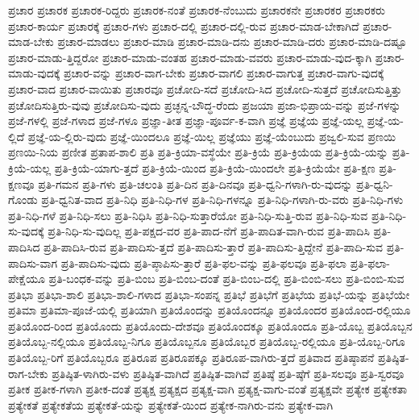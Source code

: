 {ಪ್ರಚಾರ
ಪ್ರಚಾರಕ
ಪ್ರಚಾರಕ-ರಿದ್ದರು
ಪ್ರಚಾರಕ-ನಂತೆ
ಪ್ರಚಾರಕ-ನೆಂಬುದು
ಪ್ರಚಾರಕನೇ
ಪ್ರಚಾರಕರ
ಪ್ರಚಾರಕರು
ಪ್ರಚಾರ-ಕಾರ್ಯ
ಪ್ರಚಾರಕ್ಕೆ
ಪ್ರಚಾರ-ಗಳು
ಪ್ರಚಾರ-ದಲ್ಲಿ
ಪ್ರಚಾರ-ದಲ್ಲಿ-ರುವ
ಪ್ರಚಾರ-ಮಾಡ-ಬೇಕಾಗಿದೆ
ಪ್ರಚಾರ-ಮಾಡ-ಬೇಕು
ಪ್ರಚಾರ-ಮಾಡಲು
ಪ್ರಚಾರ-ಮಾಡಿ
ಪ್ರಚಾರ-ಮಾಡಿ-ದನು
ಪ್ರಚಾರ-ಮಾಡಿ-ದರು
ಪ್ರಚಾರ-ಮಾಡಿ-ದಷ್ಟೂ
ಪ್ರಚಾರ-ಮಾಡು-ತ್ತಿದ್ದರೋ
ಪ್ರಚಾರ-ಮಾಡು-ವಂತಹ
ಪ್ರಚಾರ-ಮಾಡು-ವವರು
ಪ್ರಚಾರ-ಮಾಡು-ವುದ-ಕ್ಕಾಗಿ
ಪ್ರಚಾರ-ಮಾಡು-ವುದಕ್ಕೆ
ಪ್ರಚಾರ-ವನ್ನು
ಪ್ರಚಾರ-ವಾಗ-ಬೇಕು
ಪ್ರಚಾರ-ವಾಗಲಿ
ಪ್ರಚಾರ-ವಾಗುತ್ತ
ಪ್ರಚಾರ-ವಾಗು-ವುದಕ್ಕೆ
ಪ್ರಚಾರ-ವಾದ
ಪ್ರಚಾರ-ವಾಯಿತು
ಪ್ರಚಾರವೂ
ಪ್ರಚೋದಿ-ಸದೆ
ಪ್ರಚೋದಿ-ಸಿದ
ಪ್ರಚೋದಿ-ಸುತ್ತದೆ
ಪ್ರಚೋದಿಸುತ್ತಿತ್ತು
ಪ್ರಚೋದಿಸುತ್ತಿರು-ವುವು
ಪ್ರಚೋದಿಸು-ವುದು
ಪ್ರಚ್ಛನ್ನ-ಬೌದ್ಧ-ರೆಂದು
ಪ್ರಜಯಾ
ಪ್ರಜಾ-ಭಿಪ್ರಾಯ-ವನ್ನು
ಪ್ರಜೆ-ಗಳನ್ನು
ಪ್ರಜೆ-ಗಳಲ್ಲಿ
ಪ್ರಜೆ-ಗಳಾದ
ಪ್ರಜೆ-ಗಳೂ
ಪ್ರಜ್ಞಾ-ತೀತ
ಪ್ರಜ್ಞಾ-ಪೂರ್ವ-ಕ-ವಾಗಿ
ಪ್ರಜ್ಞೆ
ಪ್ರಜ್ಞೆಯ
ಪ್ರಜ್ಞೆ-ಯಲ್ಲ
ಪ್ರಜ್ಞೆ-ಯ-ಲ್ಲಿದೆ
ಪ್ರಜ್ಞೆ-ಯ-ಲ್ಲಿರು-ವುದು
ಪ್ರಜ್ಞೆ-ಯಿಂದಲೂ
ಪ್ರಜ್ಞೆ-ಯಿಲ್ಲ
ಪ್ರಜ್ಞೆಯು
ಪ್ರಜ್ಞೆ-ಯೆಂಬುದು
ಪ್ರಜ್ವಲಿ-ಸುವ
ಪ್ರಣಯಿ
ಪ್ರಣಯಿ-ನಿಯ
ಪ್ರಣೀತ
ಪ್ರತಾಪ-ಶಾಲಿ
ಪ್ರತಿ
ಪ್ರತಿ-ಕ್ರಿಯಾ-ವಸ್ಥೆಯೇ
ಪ್ರತಿ-ಕ್ರಿಯೆ
ಪ್ರತಿ-ಕ್ರಿಯೆಯ
ಪ್ರತಿ-ಕ್ರಿಯೆ-ಯನ್ನು
ಪ್ರತಿ-ಕ್ರಿಯೆ-ಯಲ್ಲ
ಪ್ರತಿ-ಕ್ರಿಯೆ-ಯಾಗು-ತ್ತದೆ
ಪ್ರತಿ-ಕ್ರಿಯೆ-ಯಿಂದ
ಪ್ರತಿ-ಕ್ರಿಯೆ-ಯಿಂದಲೇ
ಪ್ರತಿ-ಕ್ರಿಯೆಯೇ
ಪ್ರತಿ-ಕ್ಷಣ
ಪ್ರತಿ-ಕ್ಷಣವೂ
ಪ್ರತಿ-ಗಮನ
ಪ್ರತಿ-ಗಳು
ಪ್ರತಿ-ಚಲಂತಿ
ಪ್ರತಿ-ದಿನ
ಪ್ರತಿ-ದಿನವೂ
ಪ್ರತಿ-ಧ್ವನಿ-ಗಳಾಗಿ-ರು-ವುದನ್ನು
ಪ್ರತಿ-ಧ್ವನಿ-ಗೊಂಡು
ಪ್ರತಿ-ಧ್ವನಿತ-ವಾದ
ಪ್ರತಿ-ನಿಧಿ
ಪ್ರತಿ-ನಿಧಿ-ಗಳ
ಪ್ರತಿ-ನಿಧಿ-ಗಳನ್ನೂ
ಪ್ರತಿ-ನಿಧಿ-ಗಳಾಗಿ-ರು-ವರು
ಪ್ರತಿ-ನಿಧಿ-ಗಳು
ಪ್ರತಿ-ನಿಧಿ-ಗಳೆ
ಪ್ರತಿ-ನಿಧಿ-ಸಲು
ಪ್ರತಿ-ನಿಧಿಸಿ
ಪ್ರತಿ-ನಿಧಿ-ಸುತ್ತಾರೆಯೋ
ಪ್ರತಿ-ನಿಧಿ-ಸುತ್ತಿ-ರುವ
ಪ್ರತಿ-ನಿಧಿ-ಸುವ
ಪ್ರತಿ-ನಿಧಿ-ಸು-ವುದಕ್ಕೆ
ಪ್ರತಿ-ನಿಧಿ-ಸು-ವುದಿಲ್ಲ
ಪ್ರತಿ-ಪಕ್ಷದ-ವರ
ಪ್ರತಿ-ಪಾದ-ನೆಗೆ
ಪ್ರತಿ-ಪಾದಿತ-ವಾಗಿ-ರುವ
ಪ್ರತಿ-ಪಾದಿಸಿ
ಪ್ರತಿ-ಪಾದಿಸಿದ
ಪ್ರತಿ-ಪಾದಿಸಿ-ರುವ
ಪ್ರತಿ-ಪಾದಿಸು-ತ್ತದೆ
ಪ್ರತಿ-ಪಾದಿಸು-ತ್ತಾರೆ
ಪ್ರತಿ-ಪಾದಿಸು-ತ್ತಿದ್ದೇನೆ
ಪ್ರತಿ-ಪಾದಿ-ಸುವ
ಪ್ರತಿ-ಪಾದಿಸು-ವಾಗ
ಪ್ರತಿ-ಪಾದಿಸು-ವುದು
ಪ್ರತಿ-ಪ್ಠಾಪಿಸು-ತ್ತಾರೆ
ಪ್ರತಿ-ಫಲ-ವನ್ನು
ಪ್ರತಿ-ಫಲವೂ
ಪ್ರತಿ-ಫಲಾ
ಪ್ರತಿ-ಫಲಾ-ಪೇಕ್ಷೆಯೂ
ಪ್ರತಿ-ಬಂಧಕ-ವನ್ನು
ಪ್ರತಿ-ಬಿಂಬ
ಪ್ರತಿ-ಬಿಂಬ-ದಂತೆ
ಪ್ರತಿ-ಬಿಂಬ-ದಲ್ಲಿ
ಪ್ರತಿ-ಬಿಂಬಿ-ಸಲು
ಪ್ರತಿ-ಬಿಂಬಿ-ಸುವ
ಪ್ರತಿಭಾ
ಪ್ರತಿಭಾ-ಶಾಲಿ
ಪ್ರತಿಭಾ-ಶಾಲಿ-ಗಳಾದ
ಪ್ರತಿಭಾ-ಸಂಪನ್ನ
ಪ್ರತಿಭೆ
ಪ್ರತಿಭೆಗೆ
ಪ್ರತಿಭೆಯ
ಪ್ರತಿಭೆ-ಯನ್ನು
ಪ್ರತಿಭೆಯೇ
ಪ್ರತಿಮಾ
ಪ್ರತಿಮಾ-ಪೂಜೆ-ಯಲ್ಲಿ
ಪ್ರತಿಯಾಗಿ
ಪ್ರತಿಯೊಂದನ್ನು
ಪ್ರತಿಯೊಂದನ್ನೂ
ಪ್ರತಿಯೊಂದರ
ಪ್ರತಿಯೊಂದ-ರಲ್ಲಿಯೂ
ಪ್ರತಿಯೊಂದ-ರಿಂದ
ಪ್ರತಿಯೊಂದು
ಪ್ರತಿಯೊಂದು-ದೇಶವೂ
ಪ್ರತಿಯೊಂದಕ್ಕೂ
ಪ್ರತಿಯೊಂದೂ
ಪ್ರತಿ-ಯೊಬ್ಬ
ಪ್ರತಿಯೊಬ್ಬನ
ಪ್ರತಿಯೊಬ್ಬ-ನಲ್ಲಿಯೂ
ಪ್ರತಿಯೊಬ್ಬ-ನಿಗೂ
ಪ್ರತಿಯೊಬ್ಬನೂ
ಪ್ರತಿಯೊಬ್ಬರ
ಪ್ರತಿಯೊಬ್ಬ-ರಲ್ಲಿಯೂ
ಪ್ರತಿ-ಯೊಬ್ಬ-ರಿಗೂ
ಪ್ರತಿಯೊಬ್ಬ-ರಿಗೆ
ಪ್ರತಿಯೊಬ್ಬರೂ
ಪ್ರತಿರೂಪ
ಪ್ರತಿರೂಪಕ್ಕೂ
ಪ್ರತಿರೂಪ-ವಾಗಿರು-ತ್ತದೆ
ಪ್ರತಿವಾದ
ಪ್ರತಿಷ್ಠಾಪನೆ
ಪ್ರತಿಷ್ಠಿತ-ರಾಗ-ಬೇಕು
ಪ್ರತಿಷ್ಠಿತ-ಳಾಗಿರು-ವಳು
ಪ್ರತಿಷ್ಠಿತ-ವಾಗಿದೆ
ಪ್ರತಿಷ್ಠಿತ-ವಾಗಿವೆ
ಪ್ರತಿಷ್ಠೆ
ಪ್ರತಿ-ಷ್ಠೆಗೆ
ಪ್ರತಿ-ಸಲವೂ
ಪ್ರತಿ-ಸ್ವರವೂ
ಪ್ರತೀಕ
ಪ್ರತೀಕ-ಗಳಾಗಿ
ಪ್ರತೀಕ-ದಂತೆ
ಪ್ರತ್ಯಕ್ಷ
ಪ್ರತ್ಯಕ್ಷದ
ಪ್ರತ್ಯಕ್ಷ-ವಾಗಿ
ಪ್ರತ್ಯಕ್ಷ-ವಾಗು-ವಂತೆ
ಪ್ರತ್ಯಕ್ಷವೇ
ಪ್ರತ್ಯೇಕ
ಪ್ರತ್ಯೇಕತಾ
ಪ್ರತ್ಯೇಕತೆ
ಪ್ರತ್ಯೇಕತೆಯ
ಪ್ರತ್ಯೇಕತೆ-ಯನ್ನು
ಪ್ರತ್ಯೇಕತೆ-ಯಿಂದ
ಪ್ರತ್ಯೇಕ-ನಾಗಿರು-ವನು
ಪ್ರತ್ಯೇಕ-ವಾಗಿ
}

